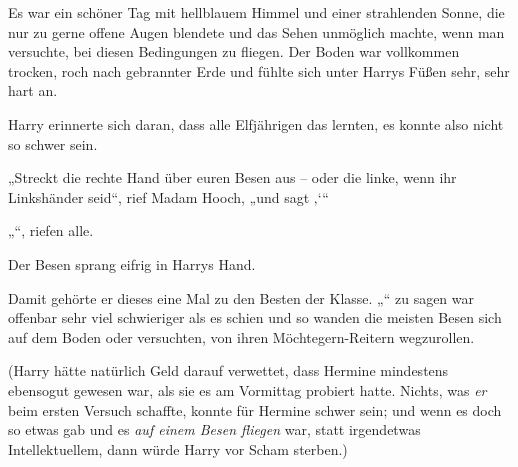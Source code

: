 Es war ein schöner Tag mit hellblauem Himmel und einer strahlenden Sonne, die nur zu gerne offene Augen blendete und das Sehen unmöglich machte, wenn man versuchte, bei diesen Bedingungen zu fliegen. Der Boden war vollkommen trocken, roch nach gebrannter Erde und fühlte sich unter Harrys Füßen sehr, sehr hart an.

Harry erinnerte sich daran, dass alle Elfjährigen das lernten, es konnte also nicht so schwer sein.

„Streckt die rechte Hand über euren Besen aus – oder die linke, wenn ihr Linkshänder seid“, rief Madam Hooch, „und sagt ‚‘“

„“, riefen alle.

Der Besen sprang eifrig in Harrys Hand.

Damit gehörte er dieses eine Mal zu den Besten der Klasse. „“ zu sagen war offenbar sehr viel schwieriger als es schien und so wanden die meisten Besen sich auf dem Boden oder versuchten, von ihren Möchtegern-Reitern wegzurollen.

(Harry hätte natürlich Geld darauf verwettet, dass Hermine mindestens ebensogut gewesen war, als sie es am Vormittag probiert hatte. Nichts, was \emph{er} beim ersten Versuch schaffte, konnte für Hermine schwer sein; und wenn es doch so etwas gab und es \emph{auf einem Besen fliegen} war, statt irgendetwas Intellektuellem, dann würde Harry vor Scham sterben.)


